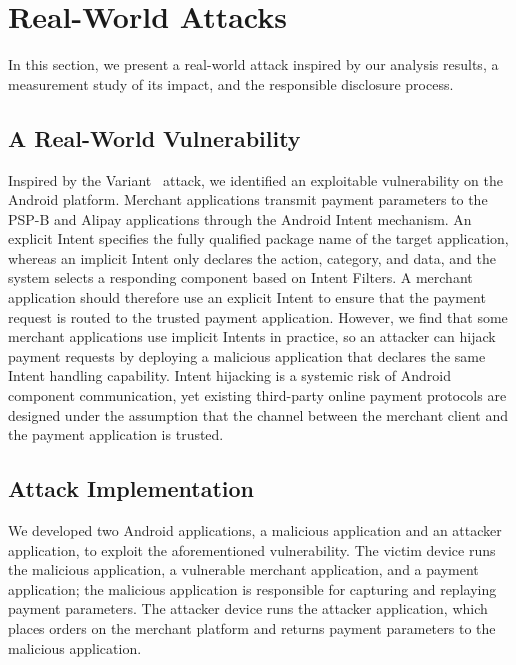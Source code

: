 
\section{Real-World Attacks} \label{sec:real_world}

In this section, we present a real-world attack inspired by our analysis results, a measurement study of its impact, and the responsible disclosure process.

\subsection{A Real-World Vulnerability}

Inspired by the Variant~ attack, we identified an exploitable vulnerability on the Android platform.
Merchant applications transmit payment parameters to the PSP-B and Alipay applications through the Android Intent mechanism.
An explicit Intent specifies the fully qualified package name of the target application, whereas an implicit Intent only declares the action, category, and data, and the system selects a responding component based on Intent Filters.
A merchant application should therefore use an explicit Intent to ensure that the payment request is routed to the trusted payment application.
However, we find that some merchant applications use implicit Intents in practice, so an attacker can hijack payment requests by deploying a malicious application that declares the same Intent handling capability.
Intent hijacking is a systemic risk of Android component communication, yet existing third-party online payment protocols are designed under the assumption that the channel between the merchant client and the payment application is trusted.

\subsection{Attack Implementation}

We developed two Android applications, a malicious application and an attacker application, to exploit the aforementioned vulnerability.
The victim device runs the malicious application, a vulnerable merchant application, and a payment application; the malicious application is responsible for capturing and replaying payment parameters.
The attacker device runs the attacker application, which places orders on the merchant platform and returns payment parameters to the malicious application.


